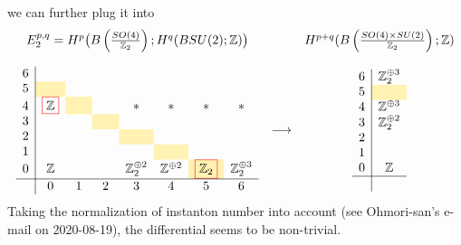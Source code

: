 \documentclass[12pt]{article}
\numberwithin{equation}{section}
\newcommand*{\red}[1]{\textcolor{red}{#1}}
\newcommand*{\black}[1]{\textcolor{black}{#1}}
\def\bZ{\mathbb{Z}}
\begin{document}
we can further plug it into
\begin{equation}
	\begin{array}{ccc}
		E_2^{p,q}=H^p\big(B\left(\tfrac{SO(4)}{\bZ_2}\right);H^q(BSU(2);\bZ)\big) && H^{p+q}(B\left(\tfrac{SO(4)\times SU(2)}{\bZ_2}\right);\bZ)\vspace{4mm}\\
		\begin{array}{c|ccccccccccccc}
			6  &&&&&& \\
			5  & \cellcolor{lightyellow} & \hphantom{\bZ_2} & \hphantom{\bZ_2} & \hphantom{\bZ_2} & \hphantom{\bZ_2} & \hphantom{\bZ_2} \\
			4  & \red{\fbox{\black{$\bZ$}}} & \cellcolor{lightyellow} && \ast & \ast & \ast & \ast\\
			3  &  && \cellcolor{lightyellow} &&&\\
			2  &&  && \cellcolor{lightyellow} &&\\
			1  &  &&  && \cellcolor{lightyellow} &&\\
			0 & \bZ &  && \bZ_2^{\oplus 2} & \bZ^{\oplus 2} & \red{\fbox{\black{$\bZ_2$}}}\cellcolor{lightyellow} & \bZ_2^{\oplus 3}\\
			\hline
			& 0 & 1 & 2 & 3 & 4 & 5 & 6 \\
		\end{array}
		& \longrightarrow & 
		\begin{array}{c|c}
			6  & \bZ_2^{\oplus 3}\\
			5  & \cellcolor{lightyellow}\\
			4  & \bZ^{\oplus 3}\\
			3  & \bZ_2^{\oplus 2}\\
			2  & \\
			1  & \\
			0 & \bZ\\
			\hline\\
		\end{array}
	\end{array}
\end{equation}
Taking the normalization of instanton number into account (see Ohmori-san's e-mail on 2020-08-19),
the differential \red{\fbox{\black{$d_2 : E_{0,4} \to E_{5,0}$}}} seems to be non-trivial.
\end{document}
